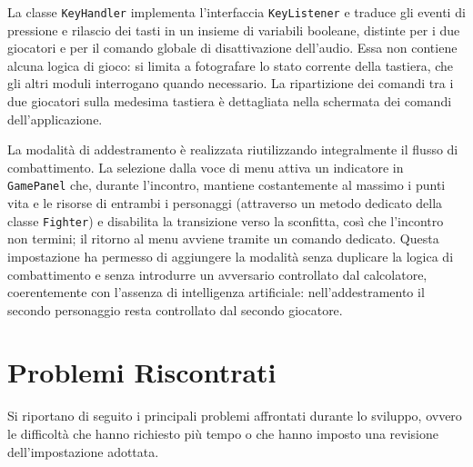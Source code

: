 \documentclass[12pt,a4paper]{report}
\begin{document}
La classe \texttt{KeyHandler} implementa l'interfaccia \texttt{KeyListener} e traduce gli eventi di pressione e rilascio dei tasti in un insieme di variabili booleane, distinte per i due giocatori e per il comando globale di disattivazione dell'audio. Essa non contiene alcuna logica di gioco: si limita a fotografare lo stato corrente della tastiera, che gli altri moduli interrogano quando necessario. La ripartizione dei comandi tra i due giocatori sulla medesima tastiera è dettagliata nella schermata dei comandi dell'applicazione.

La modalità di addestramento è realizzata riutilizzando integralmente il flusso di combattimento. La selezione dalla voce di menu attiva un indicatore in \texttt{GamePanel} che, durante l'incontro, mantiene costantemente al massimo i punti vita e le risorse di entrambi i personaggi (attraverso un metodo dedicato della classe \texttt{Fighter}) e disabilita la transizione verso la sconfitta, così che l'incontro non termini; il ritorno al menu avviene tramite un comando dedicato. Questa impostazione ha permesso di aggiungere la modalità senza duplicare la logica di combattimento e senza introdurre un avversario controllato dal calcolatore, coerentemente con l'assenza di intelligenza artificiale: nell'addestramento il secondo personaggio resta controllato dal secondo giocatore.

\section{Problemi Riscontrati}\label{ch:proris}
Si riportano di seguito i principali problemi affrontati durante lo sviluppo, ovvero le difficoltà che hanno richiesto più tempo o che hanno imposto una revisione dell'impostazione adottata.
\end{document}
